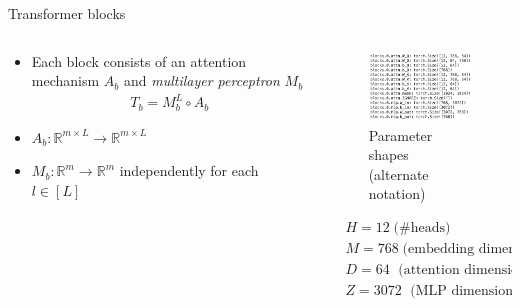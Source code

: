 \begin{frame}{Transformer blocks}
\begin{columns}
\begin{column}{.5\textwidth}
\begin{itemize}
    \item Each block consists of an attention mechanism $A_b$ and {\it multilayer perceptron} $M_b$
\begin{align*}
    T_b = M_b^L \circ A_b %
\end{align*}
    \item $A_b: \mathbb R^{m \times L} \to \mathbb R^{m \times L}$
    \item $M_b: \mathbb R^m \to \mathbb R^m$ independently for each $l \in [L]$
\end{itemize}
\end{column}
\begin{column}{.5\textwidth}
\begin{figure}
    \centering
    \includegraphics[width=4cm]{img/block_zero_shape.png}
    \caption*{Parameter shapes (alternate notation)}
    \label{fig:enter-label}
\end{figure}
\footnotesize
\begin{align*}
    &H = 12 \;\text{(\# heads)} \\
    &M = 768 \;\text{(embedding dimension)} \\
    &D = 64 \; \text{ (attention dimension)} \\
    &Z = 3072 \; \text{ (MLP dimension) }  
\end{align*}
\end{column}
\end{columns}
\end{frame}

